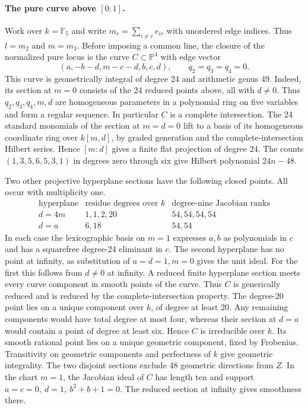 \paragraph{The pure curve above \([0:1]\).}
Work over \(k=\mathbb F_5\) and write \(m_r=\sum_{i\ne r}e_{ir}\)
with unordered edge indices. Thus \(l=m_2\) and \(m=m_3\).
Before imposing a common line, the closure of the normalized pure locus is
the curve \(C\subset\mathbb P^4\) with edge vector
\[
             (a,-b-d,m-c-d,b,c,d),\qquad q_2=q_3=q_4=0 .
\]
This curve is geometrically integral of degree 24 and arithmetic genus 49.
Indeed, its section at \(m=0\) consists of the 24 reduced points above,
all with \(d\ne0\). Thus \(q_2,q_3,q_4,m,d\) are homogeneous parameters
in a polynomial ring on five variables and form a regular sequence.
In particular \(C\) is a complete intersection. The 24 standard monomials
of the section at \(m=d=0\) lift to a basis of its homogeneous coordinate
ring over \(k[m,d]\), by graded generation and the complete-intersection
Hilbert series. Hence \([m:d]\) gives a finite flat projection of degree
24. The counts \((1,3,5,6,5,3,1)\) in degrees zero through six give
Hilbert polynomial \(24n-48\).

Two other projective hyperplane sections have the following closed points.
All occur with multiplicity one.
\[
\begin{array}{c|c|c}
 \text{hyperplane} & \text{residue degrees over } k
                    & \text{degree-nine Jacobian ranks}\\ \hline
 d=4m & 1,1,2,20 & 54,54,54,54\\
 d=a  & 6,18     & 54,54
\end{array}
\]
In each case the lexicographic basis on \(m=1\) expresses \(a,b\) as
polynomials in \(c\) and has a squarefree degree-24 eliminant in \(c\).
The second hyperplane has no point at infinity, as substitution of
\(a=d=1,m=0\) gives the unit ideal. For the first this follows from
\(d\ne0\) at infinity. A reduced finite hyperplane section meets every
curve component in smooth points of the curve. Thus \(C\) is generically
reduced and is reduced by the complete-intersection property. The
degree-20 point lies on a unique component over \(k\), of degree at
least 20. Any remaining components would have total degree at most four,
whereas their section at \(d=a\) would contain a point of degree at
least six. Hence \(C\) is irreducible over \(k\). Its smooth rational
point lies on a unique geometric component, fixed by Frobenius.
Transitivity on geometric components and perfectness of \(k\) give
geometric integrality. The two disjoint sections exclude 48 geometric
directions from \(Z\). In the chart \(m=1\), the Jacobian ideal of \(C\)
has length ten and support \(a=c=0,\ d=1,\ b^2+b+1=0\).
The reduced section at infinity gives smoothness there.

